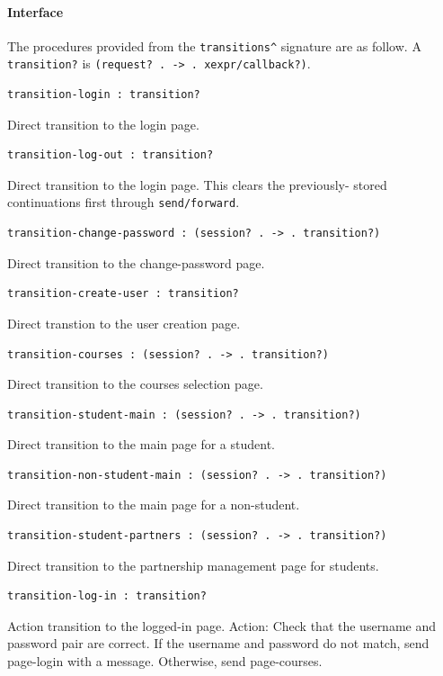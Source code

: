 \documentclass[a4paper]{article}
\begin{document}
\paragraph{Interface}\label{para:transitions-interface}

The procedures provided from the \verb|transitions^| signature are as follow.
A \verb|transition?| is \verb|(request? . -> . xexpr/callback?)|.

\begin{verbatim}
transition-login : transition?
\end{verbatim}
Direct transition to the login page.

\begin{verbatim}
transition-log-out : transition?
\end{verbatim}
Direct transition to the login page. This clears the previously-
stored continuations first through \verb|send/forward|.

\begin{verbatim}
transition-change-password : (session? . -> . transition?)
\end{verbatim}
Direct transition to the change-password page.

\begin{verbatim}
transition-create-user : transition?
\end{verbatim}
Direct transtion to the user creation page.

\begin{verbatim}
transition-courses : (session? . -> . transition?)
\end{verbatim}
Direct transition to the courses selection page.

\begin{verbatim}
transition-student-main : (session? . -> . transition?)
\end{verbatim}
Direct transition to the main page for a student.

\begin{verbatim}
transition-non-student-main : (session? . -> . transition?)
\end{verbatim}
Direct transition to the main page for a non-student.

\begin{verbatim}
transition-student-partners : (session? . -> . transition?)
\end{verbatim}
Direct transition to the partnership management page for students.

\begin{verbatim}
transition-log-in : transition?
\end{verbatim}
Action transition to the logged-in page.
Action: Check that the username and password pair are correct.
If the username and password do not match, send page-login with a message.
Otherwise, send page-courses.
\end{document}
